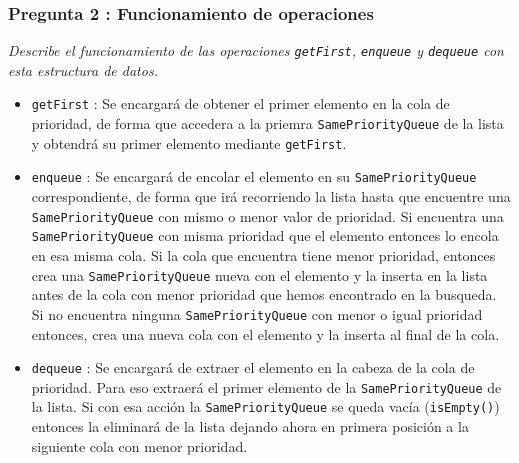 \documentclass[a4paper, 12pt]{article}
\begin{document}
            \subsubsection{Pregunta 2 : Funcionamiento de operaciones}

                \textit{Describe el funcionamiento de las operaciones 
                \texttt{getFirst}, \texttt{enqueue} y \texttt{dequeue} con esta
                estructura de datos.}\\\mbox{}

                \begin{itemize}
                    \item \texttt{getFirst} : Se encargará de obtener el primer 
                    elemento en la cola de prioridad, de forma que accedera a la 
                    priemra \texttt{SamePriorityQueue} de la lista y obtendrá su
                    primer elemento mediante \texttt{getFirst}.
                    \item \texttt{enqueue} : Se encargará de encolar el elemento
                    en su \texttt{SamePriorityQueue} correspondiente, de forma 
                    que irá recorriendo la lista hasta que encuentre una 
                    \texttt{SamePriorityQueue} con mismo o menor valor de 
                    prioridad. Si encuentra una \texttt{SamePriorityQueue} con 
                    misma prioridad que el elemento entonces lo encola en esa 
                    misma cola. Si la cola que encuentra tiene menor prioridad,
                    entonces crea una \texttt{SamePriorityQueue} nueva con el 
                    elemento y la inserta en la lista antes de la cola con menor
                    prioridad que hemos encontrado en la busqueda. Si no 
                    encuentra ninguna \texttt{SamePriorityQueue} con menor o 
                    igual prioridad entonces, crea una nueva cola con el 
                    elemento y la inserta al final de la cola.
                    \item \texttt{dequeue} : Se encargará de extraer el elemento
                    en la cabeza de la cola de prioridad. Para eso extraerá el 
                    primer elemento de la \texttt{SamePriorityQueue} de la 
                    lista. Si con esa acción la \texttt{SamePriorityQueue} se 
                    queda vacía (\texttt{isEmpty()}) entonces la eliminará de 
                    la lista dejando ahora en primera posición a la siguiente 
                    cola con menor prioridad.
                \end{itemize}
\end{document}
